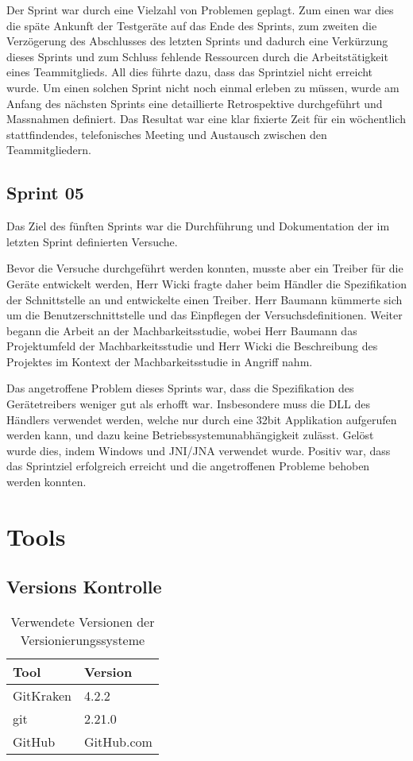 Der Sprint war durch eine Vielzahl von Problemen geplagt. Zum einen war dies die späte Ankunft der Testgeräte auf das Ende des Sprints, zum zweiten die Verzögerung des Abschlusses des letzten Sprints und dadurch eine Verkürzung dieses Sprints und zum Schluss fehlende Ressourcen durch die Arbeitstätigkeit eines Teammitglieds. All dies führte dazu, dass das Sprintziel nicht erreicht wurde. Um einen solchen Sprint nicht noch einmal erleben zu müssen, wurde am Anfang des nächsten Sprints eine detaillierte Retrospektive durchgeführt und Massnahmen definiert. Das Resultat war eine klar fixierte Zeit für ein wöchentlich stattfindendes, telefonisches Meeting und Austausch zwischen den Teammitgliedern.

\subsection{Sprint 05}
Das Ziel des fünften Sprints war die Durchführung und Dokumentation der im letzten Sprint definierten Versuche.

Bevor die Versuche durchgeführt werden konnten, musste aber ein Treiber für die Geräte entwickelt werden, Herr Wicki fragte daher beim Händler die Spezifikation der Schnittstelle an und entwickelte einen Treiber. Herr Baumann kümmerte sich um die Benutzerschnittstelle und das Einpflegen der Versuchsdefinitionen. Weiter begann die Arbeit an der Machbarkeitsstudie, wobei Herr Baumann das Projektumfeld der Machbarkeitsstudie und Herr Wicki die Beschreibung des Projektes im Kontext der Machbarkeitsstudie in Angriff nahm.

Das angetroffene Problem dieses Sprints war, dass die Spezifikation des Gerätetreibers weniger gut als erhofft war. Insbesondere muss die DLL des Händlers verwendet werden, welche nur durch eine 32bit Applikation aufgerufen werden kann, und dazu keine Betriebssystemunabhängigkeit zulässt. Gelöst wurde dies, indem Windows und JNI/JNA verwendet wurde. Positiv war, dass das Sprintziel erfolgreich erreicht und die angetroffenen Probleme behoben werden konnten.

\newpage

\section{Tools}
\label{sec:Tools}

\subsection{Versions Kontrolle}
\begin{table}[h!]
	\begin{tabular}{p{} p{}}
		\hline
		\textbf{Tool} & \textbf{Version} \\
		\hline
		GitKraken & 4.2.2 \\
		\hline
		git & 2.21.0 \\
		\hline
		GitHub & GitHub.com \\
		\hline
	\end{tabular}
	\caption{Verwendete Versionen der Versionierungssysteme}
\end{table}

